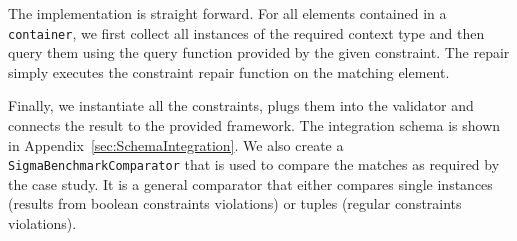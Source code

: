 The implementation is straight forward.
For all elements contained in a \texttt{container}, we first collect all instances of the required context type and then query them using the query function provided by the given constraint.
The repair simply executes the constraint repair function on the matching element.

Finally, we instantiate all the constraints, plugs them into the validator and connects the result to the provided framework.
The integration schema is shown in Appendix~\ref{sec:SchemaIntegration}.
We also create a \texttt{SigmaBenchmarkComparator} that is used to compare the matches as required by the case study.
It is a general comparator that either compares single instances (results from boolean constraints violations) or tuples (regular constraints violations).